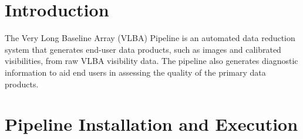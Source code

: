 \documentclass[10pt,onecolumn,final]{IEEEtran}
\begin{document}






%
\IEEEpeerreviewmaketitle



\section{Introduction}
% 
% 
% 
% 

The Very Long Baseline Array (VLBA) Pipeline is an automated data reduction system that generates end-user data products, such as images and calibrated visibilities, from raw VLBA visibility data.  The pipeline also generates diagnostic information to aid end users in assessing the quality of the primary data products.






\section{Pipeline Installation and Execution}
\end{document}
